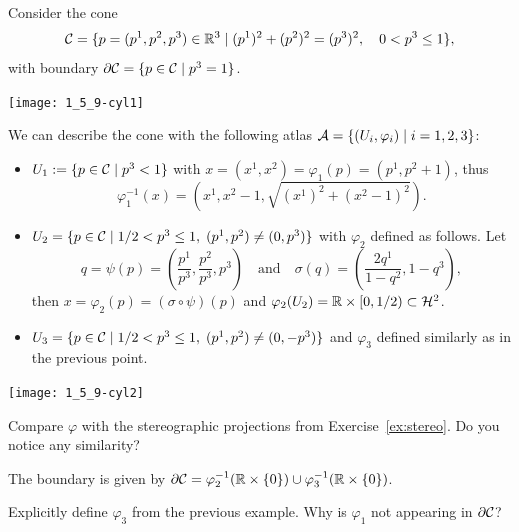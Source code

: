 \begin{example}
  Consider the cone
  \begin{equation}
    \mathcal{C} = \{p=(p^1,p^2,p^3)\in\mathbb{R}^3 \mid (p^1)^2 + (p^2)^2 = (p^3)^2, \quad 0< p^3\leq 1\},
  \end{equation}
  with boundary $\partial\mathcal{C} = \{p\in\mathcal{C} \mid p^3 = 1\}$.
  \begin{marginfigure}
  \texttt{[image: 1\_5\_9-cyl1]}
  \end{marginfigure}
  We can describe the cone with the following atlas $\mathcal{A} = \{(U_i,\varphi_i)\mid i=1,2,3\}$:
  \begin{itemize}
    \item $U_1 := \{p\in\mathcal{C}\mid p^3 < 1\}$ with $x = (x^1, x^2) = \varphi_1(p) = (p^1,p^2+1)$, thus
    \begin{equation}
      \varphi_1^{-1}(x) = \left(x^1, x^2-1, \sqrt{(x^1)^2 + (x^2-1)^2}\right).
    \end{equation}
    \item $U_2 = \{p\in\mathcal{C}\mid 1/2 < p^3 \leq 1, \; (p^1, p^2) \neq (0, p^3)\}$ with $\varphi_2$ defined as follows. Let
    \begin{equation}
      q = \psi(p) = \left(\frac{p^1}{p^3}, \frac{p^2}{p^3}, p^3\right)
      \quad\mbox{and}\quad
      \sigma(q) = \left(\frac{2q^1}{1-q^2}, 1-q^3\right),
    \end{equation}
    then $x = \varphi_2(p) = (\sigma\circ\psi)(p)$ and $\varphi_2(U_2) = \mathbb{R}\times[0,1/2) \subset\mathcal{H}^2$.
    \item $U_3 = \{p\in\mathcal{C}\mid 1/2 < p^3 \leq 1, \; (p^1, p^2) \neq (0, -p^3) \}$ and $\varphi_3$ defined similarly as in the previous point.
  \end{itemize}
  \begin{marginfigure}
  \texttt{[image: 1\_5\_9-cyl2]}
  \caption{Compare $\varphi$ with the stereographic projections from Exercise~\ref{ex:stereo}. Do you notice any similarity?}
  \end{marginfigure}
  The boundary is given by $\partial\mathcal{C} = \varphi_2^{-1}(\mathbb{R}\times\{0\}) \cup \varphi_3^{-1}(\mathbb{R}\times\{0\})$.
\end{example}

\begin{exercise}
  Explicitly define $\varphi_3$ from the previous example.
  Why is $\varphi_1$ not appearing in $\partial \mathcal{C}$?
\end{exercise}

